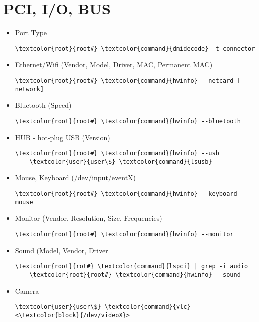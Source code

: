 \documentclass[10pt, a4paper, onecolumn, openany]{book}         %
\begin{document}
\section{PCI, I/O, BUS}
    \begin{itemize}
    \item Port Type
    \begin{Verbatim}[commandchars=\\\{\}]
    \textcolor{root}{root#} \textcolor{command}{dmidecode} -t connector
    \end{Verbatim}
    \item Ethernet/Wifi (Vendor, Model, Driver, MAC, Permanent MAC)
    \begin{Verbatim}[commandchars=\\\{\}]
    \textcolor{root}{root#} \textcolor{command}{hwinfo} --netcard [--network]
    \end{Verbatim}
    \item Bluetooth (Speed)
    \begin{Verbatim}[commandchars=\\\{\}]
    \textcolor{root}{root#} \textcolor{command}{hwinfo} --bluetooth
    \end{Verbatim}
    \item HUB - hot-plug USB (Version)
    \begin{Verbatim}[commandchars=\\\{\}]
    \textcolor{root}{root#} \textcolor{command}{hwinfo} --usb
    \textcolor{user}{user\$} \textcolor{command}{lsusb}
    \end{Verbatim}
    \item Mouse, Keyboard (/dev/input/eventX)
    \begin{Verbatim}[commandchars=\\\{\}]
    \textcolor{root}{root#} \textcolor{command}{hwinfo} --keyboard --mouse
    \end{Verbatim}
    \item Monitor (Vendor, Resolution, Size, Frequencies)
    \begin{Verbatim}[commandchars=\\\{\}]
    \textcolor{root}{root#} \textcolor{command}{hwinfo} --monitor
    \end{Verbatim}
    \item Sound (Model, Vendor, Driver
    \begin{Verbatim}[commandchars=\\\{\}]
    \textcolor{root}{rot#} \textcolor{command}{lspci} | grep -i audio
    \textcolor{root}{root#} \textcolor{command}{hwinfo} --sound
    \end{Verbatim}
    \item Camera
    \begin{Verbatim}[commandchars=\\\{\}]
    \textcolor{user}{user\$} \textcolor{command}{vlc} <\textcolor{block}{/dev/videoX}>
    \end{Verbatim}
\end{itemize}
\end{document}
